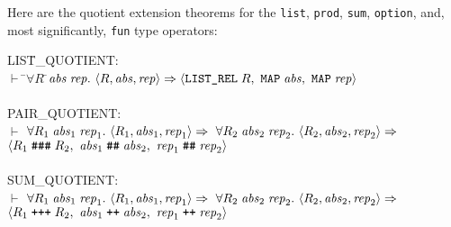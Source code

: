 \documentclass[envcountsame,runningheads]{llncs}
\begin{document}
Here are the quotient extension theorems for the {\tt list}, {\tt prod},
{\tt sum}, {\tt option}, and, most significantly, {\tt fun} type operators:

{\tt \begin{tabbing}
LIS\=T\_QUOTIENT: \\
\>  $\vdash$ \=$\forall R\;$\=${\it abs}\;{\it rep}.\
          \langle R,{\it abs},{\it rep} \rangle \Rightarrow
          \langle \mbox{\tt LIST\_REL}\;R,\
            \mbox{\tt MAP}\;{\it abs},\ \mbox{\tt MAP}\;{\it rep} \rangle$ \\
\\
PAIR\_QUOTIENT: \\
\>  $\vdash$   $\forall R_1\;{\it abs}_1\;{\it rep}_1.\
          \langle R_1,{\it abs}_1,{\it rep}_1 \rangle \Rightarrow \
          \forall R_2\;{\it abs}_2\;{\it rep}_2.\
          \langle R_2,{\it abs}_2,{\it rep}_2 \rangle \Rightarrow $ \\
\>\>\>   $\langle R_1\;\mbox{\tt \#\#\#}\;R_2,\
            {\it abs}_1\;\mbox{\tt \#\#}\;{\it abs}_2,\
            {\it rep}_1\;\mbox{\tt \#\#}\;{\it rep}_2
          \rangle$ \\
\\
SUM\_QUOTIENT: \\
\>  $\vdash$   $\forall R_1\;{\it abs}_1\;{\it rep}_1.\
          \langle R_1,{\it abs}_1,{\it rep}_1 \rangle \Rightarrow \
          \forall R_2\;{\it abs}_2\;{\it rep}_2.\
          \langle R_2,{\it abs}_2,{\it rep}_2 \rangle \Rightarrow $ \\
\>\>\>   $\langle R_1\;\mbox{\tt +++}\;R_2,\
            {\it abs}_1\;\mbox{\tt ++}\;{\it abs}_2,\
            {\it rep}_1\;\mbox{\tt ++}\;{\it rep}_2
          \rangle$ \\

\end{tabbing}}
\end{document}
